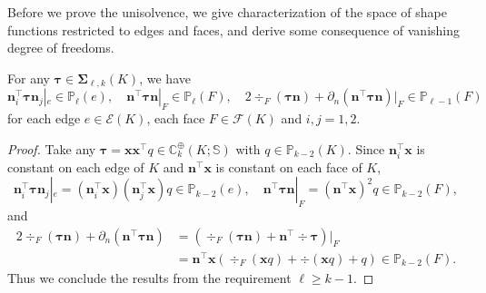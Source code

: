 Before we prove the unisolvence, we give characterization of the space of shape functions restricted to edges and faces, and derive some consequence of vanishing degree of freedoms. 

\begin{lemma}\label{lem:boundpolyl}
For any $\boldsymbol \tau\in\boldsymbol \Sigma_{\ell,k}(K)$, we have
\[
\boldsymbol  n_i^{\intercal}\boldsymbol\tau\boldsymbol  n_j|_e\in\mathbb P_{\ell}(e),\quad \boldsymbol  n^{\intercal}\boldsymbol\tau\boldsymbol  n|_F\in\mathbb P_{\ell}(F),\quad
2\div_F(\boldsymbol\tau \boldsymbol n)+ \partial_n(\boldsymbol n^{\intercal} \boldsymbol \tau\boldsymbol n)|_F\in\mathbb P_{\ell-1}(F)
\]
for each edge $e\in\mathcal E(K)$, each face $F\in\mathcal F(K)$ and $i,j=1,2$.
\end{lemma}
\begin{proof}
Take any $\boldsymbol\tau=\boldsymbol  x\boldsymbol  x^{\intercal}q\in\mathbb C_k^{\oplus}(K;\mathbb S)$ with $q\in\mathbb P_{k-2}(K)$.
Since $\boldsymbol  n_i^{\intercal}\boldsymbol  x$ is constant on each edge of $K$ and $\boldsymbol  n^{\intercal}\boldsymbol  x$ is constant on each face of $K$,
\[
\boldsymbol  n_i^{\intercal}\boldsymbol \tau\boldsymbol n_j|_{e}=(\boldsymbol  n_i^{\intercal}\boldsymbol  x)(\boldsymbol  n_j^{\intercal}\boldsymbol  x)q\in\mathbb P_{k-2}(e),\quad \boldsymbol  n^{\intercal}\boldsymbol \tau\boldsymbol  n|_F=(\boldsymbol  n^{\intercal}\boldsymbol  x)^2q\in\mathbb P_{k-2}(F),
\]
and
\begin{align*}
2\div_F(\boldsymbol\tau \boldsymbol n)+ \partial_n(\boldsymbol n^{\intercal} \boldsymbol \tau\boldsymbol n) &= 
 (\div_F(\boldsymbol\tau \boldsymbol n)+\boldsymbol n^{\intercal}\div\boldsymbol \tau)|_F \\&=
 \boldsymbol  n^{\intercal}\boldsymbol  x(\div_F(\boldsymbol x q)+\div(\boldsymbol  x q)+q)\in\mathbb P_{k-2}(F).
\end{align*}
Thus we conclude the results from the requirement $\ell\geq k-1$.
\end{proof}


